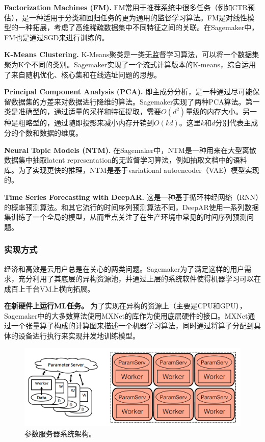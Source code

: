 \textbf{Factorization Machines (FM). }FM常用于推荐系统中很多任务（例如CTR预估），是一种适用于分类和回归任务的更为通用的监督学习算法。FM是对线性模型的一种拓展，考虑了高维稀疏数据集中不同特征之间的关联。在Sagemaker中，FM也是通过SGD来进行训练的。

\textbf{K-Means Clustering. }K-Means聚类是一类无监督学习算法，可以将一个数据集聚为K个不同的类别。Sagemaker实现了一个流式计算版本的K-means，综合运用了来自随机优化、核心集和在线选址问题的思想。

\textbf{Principal Component Analysis (PCA). }即主成分分析，是一种通过尽可能保留数据集的方差来对数据进行降维的算法。Sagemaker实现了两种PCA算法。第一类是准确型的，通过适量的采样和特征提取，需要$O(d^2)$量级的内存大小。另一种是粗略型的，通过随即投影来减小内存开销到$O(kd)$。这里$k$和$d$分别代表主成分的个数和数据的维度。

\textbf{Neural Topic Models (NTM). }在Sagemaker中，NTM是一种用来在大型离散数据集中抽取latent representation的无监督学习算法，例如抽取文档中的语料库。为了实现更快的推理，NTM是基于variational autoencoder（VAE）模型实现的。

\textbf{Time Series Forecasting with DeepAR. }这是一种基于循环神经网络（RNN）的概率预测算法。和其它流行的时间序列预测算法不同，DeepAR使用一系列数据集训练了一个全局的模型，从而重点关注了在生产环境中常见的时间序列预测问题。

\subsubsection{实现方式}
经济和高效是云用户总是在关心的两类问题。Sagemaker为了满足这样的用户需求，充分利用了其底层的异构资源池，并通过上层的系统软件使得机器学习可以在成百上千台VM上横向拓展。

\textbf{在新硬件上运行ML任务。}
为了实现在异构的资源上（主要是CPU和GPU），Sagemaker中的大多数算法使用MXNet的库作为使用底层硬件的接口。MXNet通过一个张量算子构成的计算图来描述一个机器学习算法，同时通过将算子分配到具体的设备进行执行来实现并发地训练模型。

\begin{figure}[h]
    \centerline{\includegraphics[width=\textwidth]{figures/ps-arch.png}}
    \caption{参数服务器系统架构。}
    \label{ps_arch}
\end{figure}

